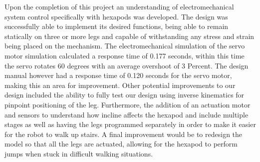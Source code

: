 Upon the completion of this project an understanding of electromechanical system control specifically with hexapods was developed. The design was successfully able to implement its desired functions, being able to remain statically on three or more legs and capable of withstanding any stress and strain being placed on the mechanism. The electromechanical simulation of the servo motor simulation calculated a response time of 0.177 seconds, within this time the servo rotates 60 degrees with an average overshoot of 3 Percent. The design manual however had a response time of 0.120 seconds for the servo motor, making this an area for improvement. Other potential improvements to our design included the ability to fully test our design using inverse kinematics for  pinpoint positioning of the leg. Furthermore, the addition of an  actuation motor and sensors to understand how incline affects the hexapod and include multiple stages as well as having the legs programmed separately in order to make it easier for the robot to walk up stairs. A final improvement would be to redesign the model so that all the legs are actuated, allowing for the hexapod to perform jumps when stuck in difficult walking situations.









